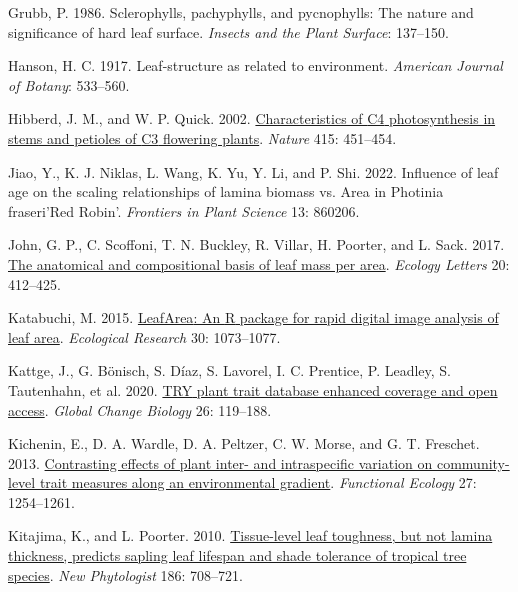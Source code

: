 \documentclass[
  12pt,
  a4paper,
,tablecaptionabove
]{scrartcl}
\newlength{\cslhangindent}
\newenvironment{CSLReferences}[2] %
 {%
  \setlength{\parindent}{0pt}
  \ifodd #1 \everypar{\setlength{\hangindent}{\cslhangindent}}\ignorespaces\fi
  \ifnum #2 > 0
  \setlength{\parskip}{#2\baselineskip}
  \fi
 }%
 {}
\begin{document}
\begin{CSLReferences}{1}{0}
\leavevmode{}%
Grubb, P. 1986. Sclerophylls, pachyphylls, and pycnophylls: {The} nature and significance of hard leaf surface. \emph{Insects and the Plant Surface}: 137--150.

\leavevmode{}%
Hanson, H. C. 1917. Leaf-structure as related to environment. \emph{American Journal of Botany}: 533--560.

\leavevmode{}%
Hibberd, J. M., and W. P. Quick. 2002. \href{https://doi.org/10.1038/415451a}{Characteristics of {C4} photosynthesis in stems and petioles of {C3} flowering plants}. \emph{Nature} 415: 451--454.

\leavevmode{}%
Jiao, Y., K. J. Niklas, L. Wang, K. Yu, Y. Li, and P. Shi. 2022. Influence of leaf age on the scaling relationships of lamina biomass vs. Area in {Photinia}\texttimes{} fraseri'{Red Robin}'. \emph{Frontiers in Plant Science} 13: 860206.

\leavevmode{}%
John, G. P., C. Scoffoni, T. N. Buckley, R. Villar, H. Poorter, and L. Sack. 2017. \href{https://doi.org/10.1111/ele.12739}{The anatomical and compositional basis of leaf mass per area}. \emph{Ecology Letters} 20: 412--425.

\leavevmode{}%
Katabuchi, M. 2015. \href{https://doi.org/10.1007/s11284-015-1307-x}{{LeafArea}: An {R} package for rapid digital image analysis of leaf area}. \emph{Ecological Research} 30: 1073--1077.

\leavevmode{}%
Kattge, J., G. Bönisch, S. Díaz, S. Lavorel, I. C. Prentice, P. Leadley, S. Tautenhahn, et al. 2020. \href{https://doi.org/10.1111/gcb.14904}{{TRY} plant trait database \textendash{} enhanced coverage and open access}. \emph{Global Change Biology} 26: 119--188.

\leavevmode{}%
Kichenin, E., D. A. Wardle, D. A. Peltzer, C. W. Morse, and G. T. Freschet. 2013. \href{https://doi.org/10.1111/1365-2435.12116}{Contrasting effects of plant inter- and intraspecific variation on community-level trait measures along an environmental gradient}. \emph{Functional Ecology} 27: 1254--1261.

\leavevmode{}%
Kitajima, K., and L. Poorter. 2010. \href{https://doi.org/10.1111/j.1469-8137.2010.03212.x}{Tissue-level leaf toughness, but not lamina thickness, predicts sapling leaf lifespan and shade tolerance of tropical tree species}. \emph{New Phytologist} 186: 708--721.


\end{CSLReferences}
\end{document}
